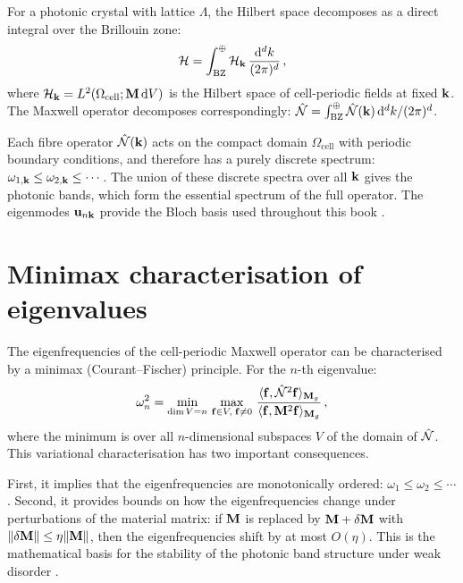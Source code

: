 For a photonic crystal with lattice $\Lambda$, the Hilbert space
decomposes as a direct integral over the Brillouin zone:
\begin{equation}\label{eq:appA-direct-integral}
  \mathcal{H}
  = \int_{\mathrm{BZ}}^\oplus\mathcal{H}_{\mathbf{k}}\,\frac{\mathrm{d}^d k}{(2\pi)^d}\,,
\end{equation}
where $\mathcal{H}_{\mathbf{k}}=L^2(\Omega_{\mathrm{cell}};\mathbf{M}\,\mathrm{d} V)$
is the Hilbert space of cell-periodic fields at fixed $\mathbf{k}$.  The
Maxwell operator decomposes correspondingly:
$\hat{\mathcal{N}}=\int_{\mathrm{BZ}}^\oplus\hat{\mathcal{N}}(\mathbf{k})\,\mathrm{d}^d k/(2\pi)^d$.

Each fibre operator $\hat{\mathcal{N}}(\mathbf{k})$ acts on the compact domain
$\Omega_{\mathrm{cell}}$ with periodic boundary conditions, and
therefore has a purely discrete spectrum:
$\omega_{1,\mathbf{k}}\leq\omega_{2,\mathbf{k}}\leq\cdots$.  The union of
these discrete spectra over all $\mathbf{k}$ gives the photonic bands,
which form the essential spectrum of the full operator.  The
eigenmodes $\mathbf{u}_{n\mathbf{k}}$ provide the Bloch basis used
throughout this book \cite{gangaraj2016berry,silveirinha2016bulk}.

\section{Minimax characterisation of eigenvalues}
\label{sec:appA-minimax}

The eigenfrequencies of the cell-periodic Maxwell operator can be
characterised by a minimax (Courant--Fischer) principle.  For the
$n$-th eigenvalue:
\begin{equation}\label{eq:appA-minimax}
  \omega_n^2 = \min_{\dim V=n}\,
  \max_{\mathbf{f}\in V,\;\mathbf{f}\neq 0}\,
  \frac{\langle \mathbf{f} , \hat{\mathcal{N}}^2\mathbf{f} \rangle_{\mathbf{M}_g}}
  {\langle \mathbf{f} , \mathbf{M}^2\mathbf{f} \rangle_{\mathbf{M}_g}}\,,
\end{equation}
where the minimum is over all $n$-dimensional subspaces $V$ of the
domain of $\hat{\mathcal{N}}$.  This variational characterisation has two
important consequences.

First, it implies that the eigenfrequencies are monotonically ordered:
$\omega_1\leq\omega_2\leq\cdots$.  Second, it provides bounds on how
the eigenfrequencies change under perturbations of the material matrix:
if $\mathbf{M}$ is replaced by $\mathbf{M}+\delta\mathbf{M}$ with
$\|\delta\mathbf{M}\|\leq\eta\|\mathbf{M}\|$, then the eigenfrequencies shift
by at most $O(\eta)$.  This is the mathematical basis for the
stability of the photonic band structure under weak disorder
\cite{ozawa2018topological}.


